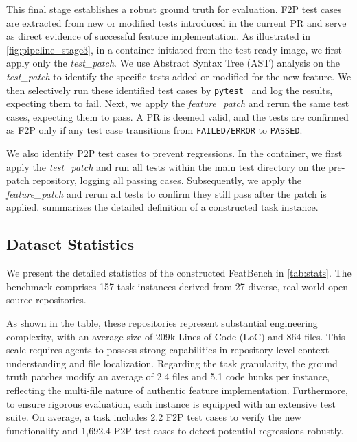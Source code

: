 This final stage establishes a robust ground truth for evaluation. F2P test cases are extracted from new or modified tests introduced in the current PR and serve as direct evidence of successful feature implementation. As illustrated in  \cref{fig:pipeline_stage3}, in a container initiated from the test-ready image, we first apply only the \textit{test\_patch}. We use Abstract Syntax Tree (AST) analysis on the \textit{test\_patch} to identify the specific tests added or modified for the new feature. We then selectively run these identified test cases by \texttt{pytest}~\cite{Pytest} and log the results, expecting them to fail. Next, we apply the \textit{feature\_patch} and rerun the same test cases, expecting them to pass. A PR is deemed valid, and the tests are confirmed as F2P only if any test case transitions from \texttt{FAILED/ERROR} to \texttt{PASSED}.

We also identify P2P test cases to prevent regressions. In the container, we first apply the \textit{test\_patch} and run all tests within the main test directory on the pre-patch repository, logging all passing cases. Subsequently, we apply the \textit{feature\_patch} and rerun all tests to confirm they still pass after the patch is applied.  summarizes the detailed definition of a constructed task instance.

\subsection{Dataset Statistics}


We present the detailed statistics of the constructed FeatBench in \cref{tab:stats}.
The benchmark comprises 157 task instances derived from 27 diverse, real-world open-source repositories.

As shown in the table, these repositories represent substantial engineering complexity, with an average size of 209k Lines of Code (LoC) and 864 files.
This scale requires agents to possess strong capabilities in repository-level context understanding and file localization.
Regarding the task granularity, the ground truth patches modify an average of 2.4 files and 5.1 code hunks per instance, reflecting the multi-file nature of authentic feature implementation.
Furthermore, to ensure rigorous evaluation, each instance is equipped with an extensive test suite.
On average, a task includes 2.2 F2P test cases to verify the new functionality and 1,692.4 P2P test cases to detect potential regressions robustly.